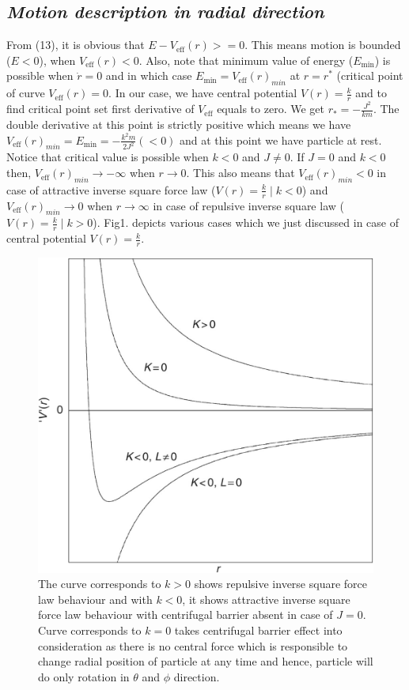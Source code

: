 \documentclass[conference]{IEEEtran}
\begin{document}
  \subsection{\emph{\textbf{Motion description in radial direction}}}
  From (13), it is obvious that $E - V_{\mathrm{eff}}(r) >=0$. This means motion is bounded ($E < 0$), when $V_{\mathrm{eff}}(r) < 0$. Also, note that minimum value of energy ($E_{\mathrm{min}}$) is possible when $\dot{r} = 0$ and in which case $E_{\mathrm{min}} = V_{\mathrm{eff}}(r)_{min}$ at $r = r^{*}$ (critical point of curve $V_{\mathrm{eff}}(r) = 0$. In our case, we have central potential $V(r) = \frac{k}{r}$ and to find critical point set first derivative of $V_{\mathrm{eff}}$ equals to zero. We get $r_{*} = - \frac{J^{2}}{km}$. The double derivative at this point is strictly positive which means we have $V_{\mathrm{eff}}(r)_{min} = E_{\mathrm{min}} = - \frac{k^{2}m}{2J^{2}} (<0)$ and at this point we have particle at rest. Notice that critical value is possible when $k<0$ and $J\not=0$. If $J=0$ and $k<0$ then, $V_{\mathrm{eff}}(r)_{min} \to -\infty$ when $r \to 0$. This also means that $V_{\mathrm{eff}}(r)_{min} < 0$ in case of attractive inverse square force law ($V(r) = \frac{k}{r} \mid{k < 0}$) and  $V_{\mathrm{eff}}(r)_{min} \to 0$ when $r \to \infty$ in case of repulsive inverse square law ($V(r) = \frac{k}{r} \mid{k >0}$). Fig1. depicts various cases which we just discussed in case of central potential $V(r) = \frac{k}{r}$.
\begin{figure}[htpb!]
\centerline{\includegraphics[scale=0.9]{fig1.png}}
\caption{The curve corresponds to $k>0$ shows repulsive inverse square force law behaviour and with $k<0$, it shows attractive inverse square force law behaviour with centrifugal barrier absent in case of $J=0$. Curve corresponds to $k=0$ takes centrifugal barrier effect into consideration as there is no central force which is responsible to change radial position of particle at any time and hence, particle will do only rotation in $\theta$ and $\phi$ direction.}
\label{fig}
\end{figure}
 
\end{document}

